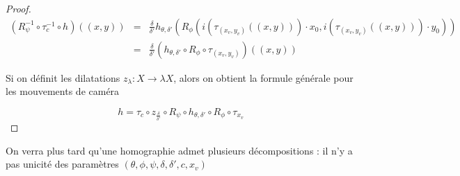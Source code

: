\begin{proof}
\begin{eqnarray*}
(R_{\psi}^{-1} \circ \tau_{c}^{-1} \circ h)((x,y)) &=& \frac{\delta}{\delta'}h_{\theta,\delta'}\left ( R_{\phi}(i(\tau_{(x_v,y_v)}((x,y))) \cdot x_{0}, i(\tau_{(x_v,y_v)}((x,y))) \cdot y_{0})\right)\\
                                               &=&\frac{\delta}{\delta'} (h_{\theta,\delta'}\circ R_{\phi} \circ \tau_{(x_v,y_v)})((x,y))
\end{eqnarray*}

Si on définit les dilatations $z_{\lambda}:X\rightarrow \lambda X$, alors on obtient la formule générale pour les mouvements de caméra

\begin{equation*}
h = \tau_{c} \circ z_{\frac{\delta}{\delta'}}  \circ R_{\psi} \circ h_{\theta,\delta'} \circ R_{\phi} \circ \tau_{x_{v}}
\end{equation*}

\end{proof}
On verra plus tard qu'une homographie admet plusieurs décompositions : il n'y a pas unicité des paramètres $(\theta,\phi,\psi,\delta,\delta',c,x_v)$
